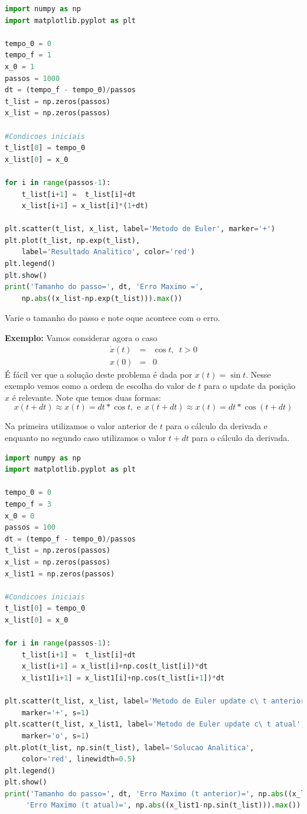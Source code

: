 \begin{lstlisting}[language = Python]
import numpy as np
import matplotlib.pyplot as plt

tempo_0 = 0
tempo_f = 1
x_0 = 1
passos = 1000
dt = (tempo_f - tempo_0)/passos
t_list = np.zeros(passos)
x_list = np.zeros(passos)

#Condicoes iniciais
t_list[0] = tempo_0
x_list[0] = x_0

for i in range(passos-1):
    t_list[i+1] =  t_list[i]+dt
    x_list[i+1] = x_list[i]*(1+dt)

plt.scatter(t_list, x_list, label='Metodo de Euler', marker='+')
plt.plot(t_list, np.exp(t_list), 
    label='Resultado Analitico', color='red')
plt.legend()
plt.show()
print('Tamanho do passo=', dt, 'Erro Maximo =', 
    np.abs((x_list-np.exp(t_list))).max())
\end{lstlisting}

Varie o tamanho do passo e note oque acontece com o erro.

{\bf Exemplo:} Vamos considerar agora o caso
\[\begin{array}{rcl}
\dot x(t) & = & \cos t,\,\,\, t>0\\
x(0) & = & 0
\end{array}\]
É fácil ver que a solução deste problema é dada por $x(t) = \sin t$. Nesse exemplo vemos como a ordem de escolha do valor de $t$ para o update da posição $x$ é relevante. Note que temos duas formas:
\[ x(t+dt) \approx x(t) = dt*\cos t,\,\, \textrm{e} \,\,\,x(t+dt) \approx x(t) = dt*\cos (t+dt)\]

Na primeira utilizamos o valor anterior de $t$ para o cálculo da derivada e enquanto no segundo caso utilizamos o valor $t+dt$ para o cálculo da derivada.


\begin{lstlisting}[language = Python]
import numpy as np
import matplotlib.pyplot as plt

tempo_0 = 0
tempo_f = 3
x_0 = 0
passos = 100
dt = (tempo_f - tempo_0)/passos
t_list = np.zeros(passos)
x_list = np.zeros(passos)
x_list1 = np.zeros(passos)

#Condicoes iniciais
t_list[0] = tempo_0
x_list[0] = x_0

for i in range(passos-1):
    t_list[i+1] =  t_list[i]+dt
    x_list[i+1] = x_list[i]+np.cos(t_list[i])*dt
    x_list1[i+1] = x_list1[i]+np.cos(t_list[i+1])*dt

plt.scatter(t_list, x_list, label='Metodo de Euler update c\ t anterior', 
    marker='+', s=1)
plt.scatter(t_list, x_list1, label='Metodo de Euler update c\ t atual',
    marker='o', s=1)
plt.plot(t_list, np.sin(t_list), label='Solucao Analitica',
    color='red', linewidth=0.5)
plt.legend()
plt.show()
print('Tamanho do passo=', dt, 'Erro Maximo (t anterior)=', np.abs((x_list-np.sin(t_list))).max(),
     'Erro Maximo (t atual)=', np.abs((x_list1-np.sin(t_list))).max())
\end{lstlisting}

